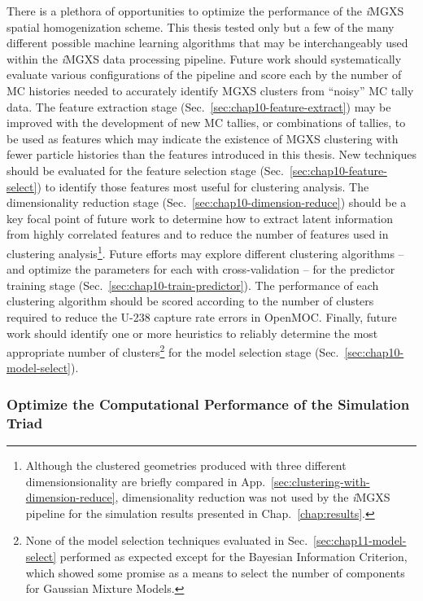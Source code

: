 There is a plethora of opportunities to optimize the performance of the \textit{i}\ac{MGXS} spatial homogenization scheme. This thesis tested only but a few of the many different possible machine learning algorithms that may be interchangeably used within the \textit{i}\ac{MGXS} data processing pipeline. Future work should systematically evaluate various configurations of the pipeline and score each by the number of \ac{MC} histories needed to accurately identify \ac{MGXS} clusters from ``noisy'' \ac{MC} tally data. The feature extraction stage (Sec.~\ref{sec:chap10-feature-extract}) may be improved with the development of new \ac{MC} tallies, or combinations of tallies, to be used as features which may indicate the existence of \ac{MGXS} clustering with fewer particle histories than the features introduced in this thesis. New techniques should be evaluated for the feature selection stage (Sec.~\ref{sec:chap10-feature-select}) to identify those features most useful for clustering analysis. The dimensionality reduction stage (Sec.~\ref{sec:chap10-dimension-reduce}) should be a key focal point of future work to determine how to extract latent information from highly correlated features and to reduce the number of features used in clustering analysis\footnote{Although the clustered geometries produced with three different dimensionsionality are briefly compared in App.~\ref{sec:clustering-with-dimension-reduce}, dimensionality reduction was not used by the \textit{i}\ac{MGXS} pipeline for the simulation results presented in Chap.~\ref{chap:results}.}. Future efforts may explore different clustering algorithms -- and optimize the parameters for each with cross-validation -- for the predictor training stage (Sec.~\ref{sec:chap10-train-predictor}). The performance of each clustering algorithm should be scored according to the number of clusters required to reduce the U-238 capture rate errors in OpenMOC. Finally, future work should identify one or more heuristics to reliably determine the most appropriate number of clusters\footnote{None of the model selection techniques evaluated in Sec.~\ref{sec:chap11-model-select} performed as expected except for the Bayesian Information Criterion, which showed some promise as a means to select the number of components for Gaussian Mixture Models.} for the model selection stage (Sec.~\ref{sec:chap10-model-select}).

\subsubsection{Optimize the Computational Performance of the Simulation Triad}
\label{subsubsec:chap12-optimize-simulation-triad}


